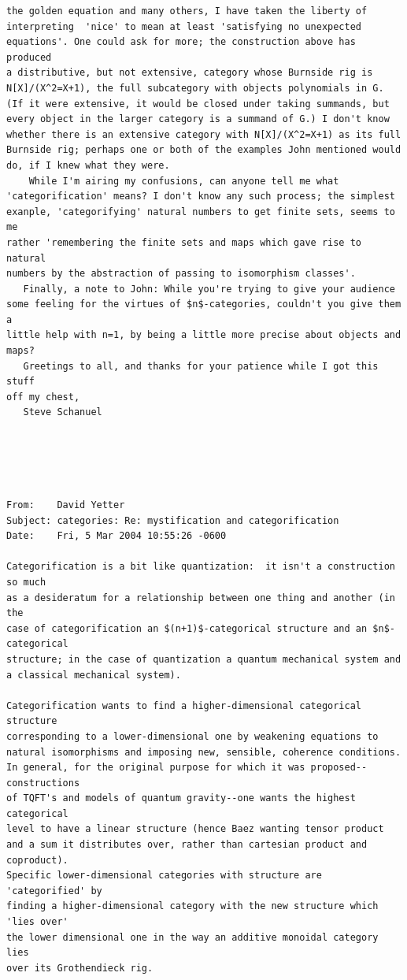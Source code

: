 \documentclass{article}
\begin{document}
\begin{verbatim}
the golden equation and many others, I have taken the liberty of
interpreting  'nice' to mean at least 'satisfying no unexpected
equations'. One could ask for more; the construction above has produced
a distributive, but not extensive, category whose Burnside rig is
N[X]/(X^2=X+1), the full subcategory with objects polynomials in G.
(If it were extensive, it would be closed under taking summands, but
every object in the larger category is a summand of G.) I don't know
whether there is an extensive category with N[X]/(X^2=X+1) as its full
Burnside rig; perhaps one or both of the examples John mentioned would
do, if I knew what they were.
    While I'm airing my confusions, can anyone tell me what
'categorification' means? I don't know any such process; the simplest
exanple, 'categorifying' natural numbers to get finite sets, seems to me
rather 'remembering the finite sets and maps which gave rise to natural
numbers by the abstraction of passing to isomorphism classes'.
   Finally, a note to John: While you're trying to give your audience
some feeling for the virtues of $n$-categories, couldn't you give them a
little help with n=1, by being a little more precise about objects and
maps?
   Greetings to all, and thanks for your patience while I got this stuff
off my chest,
   Steve Schanuel





From:    David Yetter 
Subject: categories: Re: mystification and categorification
Date:    Fri, 5 Mar 2004 10:55:26 -0600 

Categorification is a bit like quantization:  it isn't a construction so much
as a desideratum for a relationship between one thing and another (in the
case of categorification an $(n+1)$-categorical structure and an $n$-categorical
structure; in the case of quantization a quantum mechanical system and
a classical mechanical system).

Categorification wants to find a higher-dimensional categorical structure
corresponding to a lower-dimensional one by weakening equations to
natural isomorphisms and imposing new, sensible, coherence conditions.
In general, for the original purpose for which it was proposed--constructions
of TQFT's and models of quantum gravity--one wants the highest categorical
level to have a linear structure (hence Baez wanting tensor product
and a sum it distributes over, rather than cartesian product and coproduct).
Specific lower-dimensional categories with structure are 'categorified' by
finding a higher-dimensional category with the new structure which 'lies over'
the lower dimensional one in the way an additive monoidal category lies
over its Grothendieck rig.


\end{verbatim}
\end{document}
